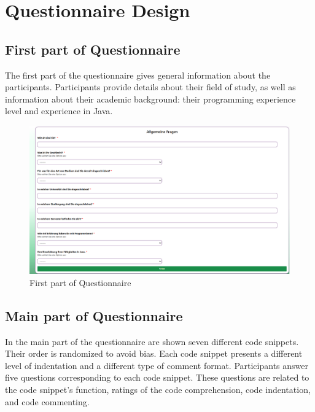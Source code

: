 \section{Questionnaire Design}


\subsection{First part of Questionnaire}
The first part of the questionnaire gives general information about the participants. 
Participants provide details about their field of study, as well as information about their academic background: their programming experience level and experience in Java.

\begin{figure} [H]
  \centering
  \includegraphics[scale=0.45]{figures/allgemein.png}
  \caption{First part of Questionnaire}
  \label{fig:AnhangsChor}
\end{figure}


\subsection{Main part of Questionnaire}

In the main part of the questionnaire are shown seven different code snippets. Their order is randomized to avoid bias. Each code snippet presents a different level of indentation and a different type of comment format.
Participants answer five questions corresponding to each code snippet. These questions are related to the code snippet’s function, ratings of the code comprehension, code indentation, and code commenting.


